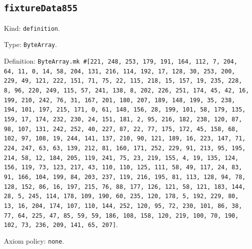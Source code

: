 \documentclass[11pt]{article}
\begin{document}
\subsection*{\texttt{fixtureData855}}
\noindent Kind: \texttt{definition}.\par
\noindent Type: \texttt{ByteArray}.\par
\noindent Definition: \texttt{ByteArray.mk \#[221, 248, 253, 179, 191, 164, 112, 7, 204, 64, 11, 0, 14, 58, 204, 131, 216, 114, 192, 17, 128, 30, 253, 200, 229, 49, 121, 222, 151, 71, 75, 22, 115, 218, 15, 157, 19, 235, 228, 8, 96, 220, 249, 115, 57, 241, 138, 8, 202, 226, 251, 174, 45, 42, 16, 199, 210, 242, 76, 31, 167, 201, 180, 207, 189, 148, 199, 35, 238, 194, 101, 197, 215, 171, 0, 61, 148, 156, 28, 199, 101, 58, 179, 135, 159, 17, 174, 232, 230, 24, 151, 181, 2, 95, 216, 182, 238, 120, 87, 98, 107, 131, 242, 252, 40, 227, 87, 22, 77, 175, 172, 45, 158, 68, 102, 97, 108, 19, 244, 141, 137, 210, 90, 121, 189, 16, 223, 147, 71, 224, 247, 63, 63, 139, 212, 81, 160, 171, 252, 229, 91, 213, 95, 195, 214, 58, 12, 184, 205, 119, 241, 75, 23, 219, 155, 4, 19, 135, 124, 156, 119, 73, 123, 217, 43, 110, 110, 125, 111, 58, 49, 117, 24, 83, 91, 166, 104, 199, 84, 203, 237, 119, 216, 195, 81, 113, 128, 94, 78, 128, 152, 86, 16, 197, 215, 76, 88, 177, 126, 121, 58, 121, 183, 144, 28, 5, 245, 114, 178, 109, 190, 60, 235, 120, 178, 5, 192, 229, 80, 13, 16, 204, 174, 107, 110, 144, 252, 120, 95, 72, 230, 101, 86, 38, 77, 64, 225, 47, 85, 59, 59, 186, 108, 158, 120, 219, 100, 70, 190, 102, 73, 236, 209, 141, 65, 207]}.\par
\noindent Axiom policy: \texttt{none}.\par
\end{document}
